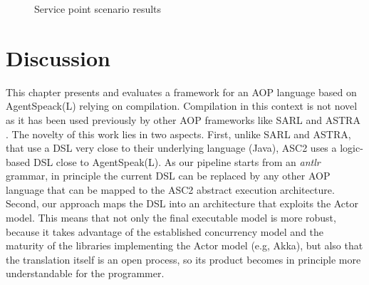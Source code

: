\begin{figure}[bt!]
\caption{Service point scenario results}
\label{fig:ping_pong1}
\end{figure}

\section{Discussion}
\label{sec:discussion}
This chapter presents and evaluates a framework for an AOP language based on AgentSpeack(L) relying on compilation. Compilation in this context is not novel as it has been used previously by other AOP frameworks like SARL \cite{Sarl} and ASTRA \cite{Astra}. The novelty of this work lies in two aspects. First, unlike SARL and ASTRA, that use a DSL very close to their underlying language (Java), ASC2 uses a logic-based DSL close to AgentSpeak(L). %
As our pipeline starts from an \textit{antlr} grammar, in principle 
the current DSL can be replaced by any other AOP language that can be mapped to the ASC2 abstract execution architecture. Second, our approach maps the DSL into an architecture that exploits the Actor model. This means that not only the final executable model is more robust, because it takes advantage of the established concurrency model and the maturity of the libraries implementing the Actor model (e.g, Akka), but also that the translation itself is an open process, so its product becomes in principle more understandable for the programmer.


